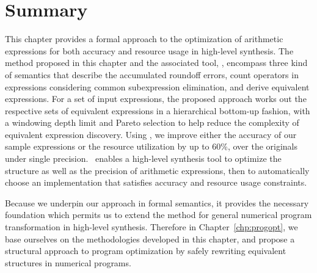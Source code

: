 \section{Summary}
\label{so:sec:conclusion}

This chapter provides a formal approach to the optimization of arithmetic
expressions for both accuracy and resource usage in high-level synthesis.  The
method proposed in this chapter and the associated tool, \soap, encompass
three kind of semantics that describe the accumulated roundoff errors, count
operators in expressions considering common subexpression elimination,
and derive equivalent expressions.  For a set of input expressions, the
proposed approach works out the respective sets of equivalent expressions in
a hierarchical bottom-up fashion, with a windowing depth limit and Pareto
selection to help reduce the complexity of equivalent expression discovery.
Using \soap, we improve either the accuracy of our sample expressions or the
resource utilization by up to 60\%, over the originals under single precision.
\soap~enables a high-level synthesis tool to optimize the structure as well
as the precision of arithmetic expressions, then to automatically choose an
implementation that satisfies accuracy and resource usage constraints.

Because we underpin our approach in formal semantics, it provides the
necessary foundation which permits us to extend the method for general
numerical program transformation in high-level synthesis.  Therefore in
Chapter~\ref{chp:progopt}, we base ourselves on the methodologies developed
in this chapter, and propose a structural approach to program optimization by
safely rewriting equivalent structures in numerical programs.

